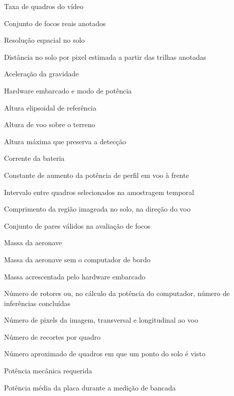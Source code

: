 \begin{simbolos}
  \item[$f_q$]                     Taxa de quadros do vídeo
  \item[$\mathcal{G}$]             Conjunto de focos reais anotados
  \item[$GSD$]                     Resolução espacial no solo
  \item[$\widehat{GSD}$] Distância no solo por pixel estimada a partir das trilhas anotadas
  \item[$g$]                       Aceleração da gravidade
  \item[$H$]                       Hardware embarcado e modo de potência
  \item[$H_e$]                     Altura elipsoidal de referência
  \item[$h$]                       Altura de voo sobre o terreno
  \item[$h_{\max}$]                Altura máxima que preserva a detecção
  \item[$I$]                       Corrente da bateria
  \item[$K$]                       Constante de aumento da potência de perfil em voo à frente
  \item[$k$]                       Intervalo entre quadros selecionados na amostragem temporal
  \item[$L$]                       Comprimento da região imageada no solo, na direção do voo
  \item[$\mathcal{M}$]             Conjunto de pares válidos na avaliação de focos
  \item[$m$]                       Massa da aeronave
  \item[$m_0$]                     Massa da aeronave sem o computador de bordo
  \item[$m_H$]                     Massa acrescentada pelo hardware embarcado
  \item[$N$]                       Número de rotores ou, no cálculo da potência do computador, número de inferências concluídas
  \item[$N_x, N_y$]                Número de pixels da imagem, transversal e longitudinal ao voo
  \item[$n_t$]                     Número de recortes por quadro
  \item[$n_v$]                     Número aproximado de quadros em que um ponto do solo é visto
  \item[$P$]                       Potência mecânica requerida
  \item[$\bar P$] Potência média da placa durante a medição de bancada

\end{simbolos}
